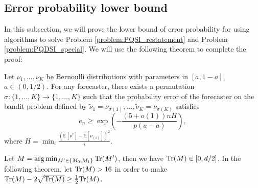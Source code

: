 \subsection{Error probability lower bound}

In this subsection, we will prove the lower bound of error probability for using algorithms to solve Problem \ref{problem:PQSI_restatement} and Problem \ref{problem:PQDSI_special}. We will use the following theorem to complete the proof:

\begin{theorem}
    \label{theorem:classical_BAI}
    Let $\nu_1,...,\nu_K$ be Bernoulli distributions with parameters in $[a,1-a]$, $a \in(0,1/2)$. For any forecaster, there exists a permutation $\sigma: \{1,..., K\} \rightarrow \{1,..., K\}$ such that the probability error of the forecaster on the bandit problem defined by $\tilde{\nu}_1= \nu_{\sigma(1)},..., \tilde{\nu}_K= \nu_{\sigma(K)}$ satisfies
    \begin{equation}
        e_n \geq \exp\left(- \frac{(5+o(1))nH}{p(a-a)}\right),
    \end{equation}
    where $H =\min_i \frac{(\mathbb{E}[\nu^*] - \mathbb{E}[\nu_{(i)}])^2}{i}$.
\end{theorem}

Let  $M = \arg\min_{M' \in \{M_0,M_1\}}\mathrm{Tr}(M')$, then we have $\mathrm{Tr}(M) \in [0,d/2]$. In the following theorem, let $\mathrm{Tr}(M) > 16$ in order to make $\mathrm{Tr}(M) - 2\sqrt{\mathrm{Tr}(M)} \geq \frac{1}{2}
\mathrm{Tr}(M) $. %

